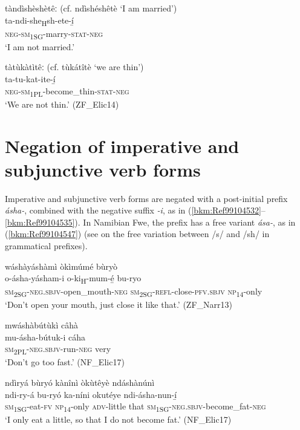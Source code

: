 \ea
\label{bkm:Ref98833526}
tàndìshèshètêː (cf. ndìshéshêtè ‘I am married’)\\
\gll ta-ndi-she\textsubscript{H}sh-ete-í̲\\
\textsc{neg}-\textsc{sm}\textsubscript{1SG}-marry-\textsc{stat}-\textsc{neg}\\
\glt ‘I am not married.’
\z

\ea
\label{bkm:Ref98833527}
tàtùkàtìtêː (cf. tùkátîtè ‘we are thin’)\\
\gll ta-tu-kat-ite-í̲\\
\textsc{neg}-\textsc{sm}\textsubscript{1PL\-}-become\_thin-\textsc{stat}-\textsc{neg}\\
\glt ‘We are not thin.’ (ZF\_Elic14)
\z
\section{Negation of imperative and subjunctive verb forms}
\label{bkm:Ref499029715}\hypertarget{Toc75352708}{}
Imperative and subjunctive verb forms are negated with a post-initial prefix \mbox{\textit{ásha-},} combined with the negative suffix \textit{-i}, as in (\ref{bkm:Ref99104532}--\ref{bkm:Ref99104535}). In Namibian Fwe, the prefix has a free variant \textit{ása-}, as in (\ref{bkm:Ref99104547}) (see  on the free variation between /s/ and /sh/ in grammatical prefixes).

\ea
\label{bkm:Ref99104532}
wáshàyáshàmì òkìmúmé bùryò\\
\gll o-ásha-yásham-i        o-ki\textsubscript{H}-mum-é̲    bu-ryo\\
\textsc{sm}\textsubscript{2SG}-\textsc{neg}.\textsc{sbjv}-open\_mouth-\textsc{neg}  \textsc{sm}\textsubscript{2SG}-\textsc{refl}-close-\textsc{pfv}.\textsc{sbjv}  \textsc{np}\textsubscript{14}-only\\
\glt ‘Don’t open your mouth, just close it like that.’ (ZF\_Narr13)
\z

\ea
mwáshàbútùkì câhà\\
\gll mu-ásha-bútuk-i    cáha\\
\textsc{sm}\textsubscript{2PL}-\textsc{neg}.\textsc{sbjv}-run-\textsc{neg}  very\\
\glt ‘Don’t go too fast.’ (NF\_Elic17)
\z

\ea
\label{bkm:Ref99104535}
ndìryá bùryó kànînì òkùtêyè ndáshànúnì\\
\gll ndi-ry-á  bu-ryó  ka-níni okutéye  ndi-ásha-nun-í̲ \\
\textsc{sm}\textsubscript{1SG}-eat-\textsc{fv}  \textsc{np}\textsubscript{14}-only  \textsc{adv}-little
that    \textsc{sm}\textsubscript{1SG}-\textsc{neg}.\textsc{sbjv}-become\_fat-\textsc{neg}\\
\glt ‘I only eat a little, so that I do not become fat.’ (NF\_Elic17)
\z

